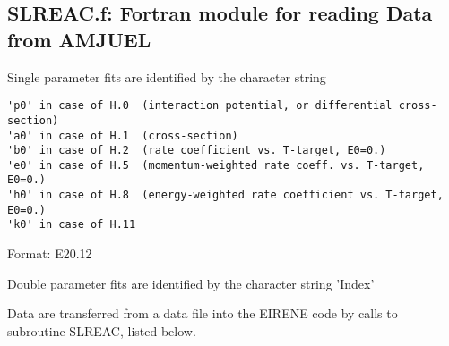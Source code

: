 \documentclass[12pt,dvipdfmx]{article}
\begin{document}
\subsection{SLREAC.f: Fortran module for reading Data from AMJUEL}\label{sec1.2}
Single parameter fits are identified by the character string
\begin{small}\begin{verbatim}
'p0' in case of H.0  (interaction potential, or differential cross-section)
'a0' in case of H.1  (cross-section)
'b0' in case of H.2  (rate coefficient vs. T-target, E0=0.)
'e0' in case of H.5  (momentum-weighted rate coeff. vs. T-target, E0=0.)
'h0' in case of H.8  (energy-weighted rate coefficient vs. T-target, E0=0.)
'k0' in case of H.11
\end{verbatim}\end{small}
Format: E20.12

Double parameter fits are identified by the character string
'Index'


Data are transferred from a data file into the EIRENE code by
calls to subroutine SLREAC, listed below.
\end{document}
